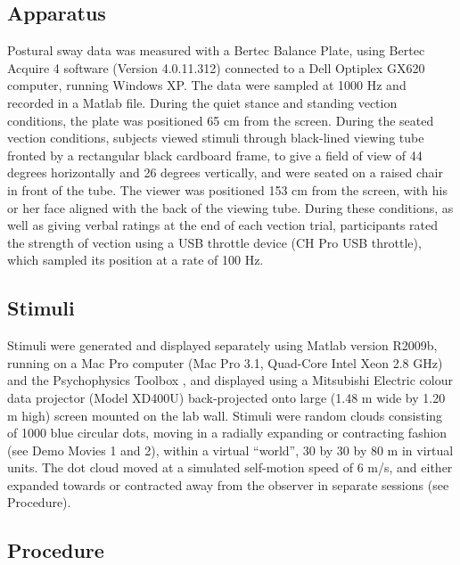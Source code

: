 \documentclass[11pt]{article}
\begin{document}
\begin{linenumbers}
\subsection*{Apparatus}
Postural sway data was measured with a Bertec Balance Plate, using Bertec Acquire 4 software (Version 4.0.11.312) connected to a Dell Optiplex GX620 computer, running Windows XP. The data were sampled at 1000 Hz and recorded in a Matlab file. During the quiet stance and standing vection conditions, the plate was positioned 65 cm from the screen. During the seated vection conditions, subjects viewed stimuli through black-lined viewing tube fronted by a rectangular black cardboard frame, to give a field of view of 44 degrees horizontally and 26 degrees vertically, and were seated on a raised chair in front of the tube. The viewer was positioned 153 cm from the screen, with his or her face aligned with the back of the viewing tube.  During these conditions, as well as giving verbal ratings at the end of each vection trial, participants rated the strength of vection using a USB throttle device (CH Pro USB throttle), which sampled its position at a rate of 100 Hz. 


\subsection*{Stimuli}
Stimuli were generated and displayed separately using Matlab version R2009b, running on a Mac Pro computer (Mac Pro 3.1, Quad-Core Intel Xeon 2.8 GHz) and the Psychophysics Toolbox \cite{Brainard:1997we, Pelli:1997uf}, and displayed using a Mitsubishi Electric colour data projector (Model XD400U) back-projected onto large (1.48 m wide by 1.20 m high) screen mounted on the lab wall. Stimuli were random clouds consisting of 1000 blue circular dots, moving in a radially expanding or contracting fashion (see Demo Movies 1 and 2), within a virtual  ``world'', 30 by 30 by 80 m in virtual units. The dot cloud moved at a simulated self-motion speed of 6 m/s, and either expanded towards or contracted away from the observer in separate sessions (see Procedure). 

\subsection*{Procedure}


\end{linenumbers}
\end{document}
